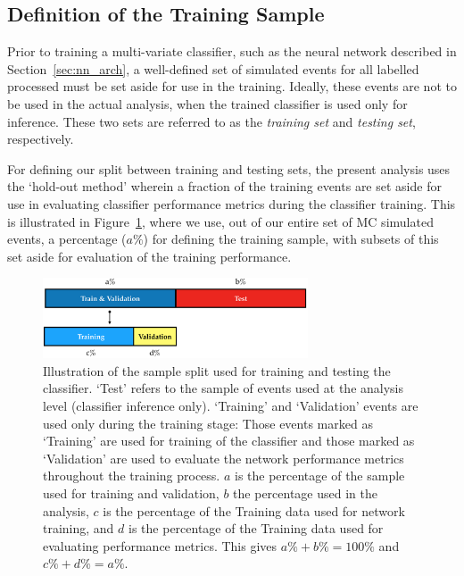 \subsection{Definition of the Training Sample}
\label{sec:nn_train}

Prior to training a multi-variate classifier, such as the neural network described in Section~\ref{sec:nn_arch},
a well-defined set of simulated events for all labelled processed must be set aside for use in the training.
Ideally, these events are not to be used in the actual analysis, when the trained classifier is used only
for inference.
These two sets are referred to as the \textit{training set} and \textit{testing set}, respectively.

For defining our split between training and testing sets, the present analysis uses the `hold-out method' wherein
a fraction of the training events are set aside for use in evaluating classifier performance metrics
during the classifier training.
This is illustrated in Figure~\ref{fig:nn_sample_split}, where we use, out of our entire set of MC simulated
events, a percentage ($a\%$) for defining the training sample, with subsets of this set aside for evaluation
of the training performance.

\begin{figure}[!htb]
    \begin{center}
        \includegraphics[width=0.7\textwidth]{figures/search_hh/mva/wwbb_nn_sample_breakdown}
        \caption{
            Illustration of the sample split used for training and testing the classifier.
            `Test' refers to the sample of events used at the analysis level (classifier inference only).
            `Training' and `Validation' events are used only during the training stage:
            Those events marked as `Training' are used for training of the classifier and those
            marked as `Validation' are used to evaluate the network performance metrics throughout
            the training process.
            $a$ is the percentage of the sample used for training and validation, $b$ the percentage used
            in the analysis, $c$ is the percentage of the Training data used for network training, and $d$ is the percentage
            of the Training data used for evaluating performance metrics.
            This gives $a\% + b\% = 100\%$ and $c\% + d\% = a\%$.
        }
        \label{fig:nn_sample_split}
    \end{center}
\end{figure}

